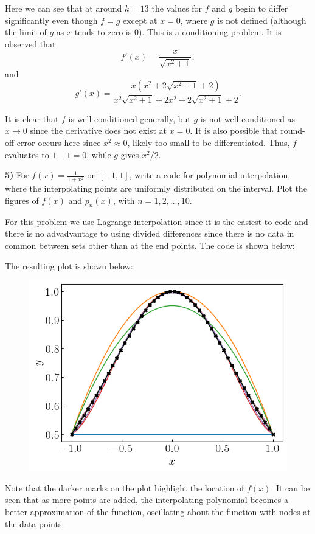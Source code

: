 \documentclass[12pt,a4paper]{article}
\newcommand{\prob}[2]{\textbf{#1)} #2}
\begin{document}
\begin{table}[H]
    \begin{center}
         
    \end{center}
\end{table}


Here we can see that at around $k = 13$ the values for $f$ and $g$ begin to differ significantly even though $f = g$ except at $x = 0$, where $g$ is not defined (although the limit of $g$ as $x$ tends to zero is 0).
This is a conditioning problem. 
It is observed that 
\[
f'\left( x \right) = \frac{x}{\sqrt{x^{2} + 1}}
,\]
and
\[
g'\left( x \right) = \frac{x \left(x^{2} + 2 \sqrt{x^{2} + 1} + 2\right)}{x^{2} \sqrt{x^{2} + 1} + 2 x^{2} + 2 \sqrt{x^{2} + 1} + 2}
.\]

It is clear that $f$ is well conditioned generally, but $g$ is not well conditioned as $x \rightarrow 0$ since the derivative does not exist at $x=0$.
It is also possible that round-off error occurs here since $x^2 \approx 0$, likely too small to be differentiated.
Thus, $f$ evaluates to $1 - 1 = 0$, while $g$ gives $x^2/2$.

\prob{5}{For $f\left( x \right) = \frac{1}{1+x^2}$ on $[-1,1]$, write a code for polynomial interpolation, where the interpolating points are uniformly distributed on the interval. Plot the figures of $f(x)$ and $p_{n}(x)$, with $n = 1,2,\ldots,10$.}

For this problem we use Lagrange interpolation since it is the easiest to code and there is no advadvantage to using divided differences since there is no data in common between sets other than at the end points.
The code is shown below:


The resulting plot is shown below:
\begin{figure}[H]
    \begin{center}
        \includegraphics[scale=0.75]{./fig1.png}
    \end{center} 
\end{figure}

Note that the darker marks on the plot highlight the location of $f(x)$.
It can be seen that as more points are added, the interpolating polynomial becomes a better approximation of the function, oscillating about the function with nodes at the data points.
\end{document}
